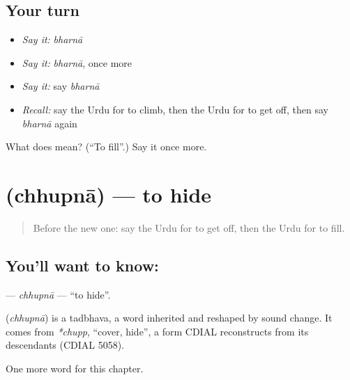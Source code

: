 \subsection*{Your turn}
\begin{itemize}
\raggedright
  \item \emph{Say it:} \emph{bharnā}
  \item \emph{Say it:} \emph{bharnā}, once more
  \item \emph{Say it:} say \emph{bharnā}
  \item \emph{Recall:} say the Urdu for to climb, then the Urdu for to get off, then say \emph{bharnā} again
\end{itemize}

\begin{tcolorbox}[breakable,colback=teal!4,colframe=teal!35!black,title={Before you move on}]
What does  mean? (\textquotedblleft{}To fill\textquotedblright{}.) Say it once more.
\end{tcolorbox}
\section[\texorpdfstring{\ur{چھپنا} (chhupnā)}{چھپنا (chhupnā)}]{ (chhupnā) — to hide}

\label{lesson:UR-C142-chhupna}



\begin{quote}
Before the new one: say the Urdu for to get off, then the Urdu for to fill.
\end{quote}

\subsection*{You'll want to know: }
\textbf{} — \emph{chhupnā} — \textquotedblleft{}to hide\textquotedblright{}.

\begin{cousinweb}
\textbf{} (\emph{chhupnā}) is a tadbhava, a word inherited and reshaped by sound change. It comes from \emph{*chupp}, \textquotedblleft{}cover, hide\textquotedblright{}, a form CDIAL reconstructs from its descendants (CDIAL 5058).
\end{cousinweb}

\begin{grammarlens}[title={What you've built}]
One more word for this chapter.
\end{grammarlens}

